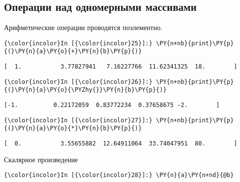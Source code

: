 \subsection{Операции над одномерными массивами}
\label{numpy2}

Арифметические операции проводятся поэлементно.

    \begin{Verbatim}[commandchars=\\\{\}]
{\color{incolor}In [{\color{incolor}25}]:} \PY{n+nb}{print}\PY{p}{(}\PY{n}{a}\PY{o}{+}\PY{n}{b}\PY{p}{)}
\end{Verbatim}

    \begin{Verbatim}[commandchars=\\\{\}]
[  1.           3.77827941   7.16227766  11.62341325  18.        ]

    \end{Verbatim}

    \begin{Verbatim}[commandchars=\\\{\}]
{\color{incolor}In [{\color{incolor}26}]:} \PY{n+nb}{print}\PY{p}{(}\PY{n}{a}\PY{o}{\PYZhy{}}\PY{n}{b}\PY{p}{)}
\end{Verbatim}

    \begin{Verbatim}[commandchars=\\\{\}]
[-1.          0.22172059  0.83772234  0.37658675 -2.        ]

    \end{Verbatim}

    \begin{Verbatim}[commandchars=\\\{\}]
{\color{incolor}In [{\color{incolor}27}]:} \PY{n+nb}{print}\PY{p}{(}\PY{n}{a}\PY{o}{*}\PY{n}{b}\PY{p}{)}
\end{Verbatim}

    \begin{Verbatim}[commandchars=\\\{\}]
[  0.           3.55655882  12.64911064  33.74047951  80.        ]

    \end{Verbatim}

    Скалярное произведение

    \begin{Verbatim}[commandchars=\\\{\}]
{\color{incolor}In [{\color{incolor}28}]:} \PY{n}{a}\PY{n+nd}{@b}
\end{Verbatim}

